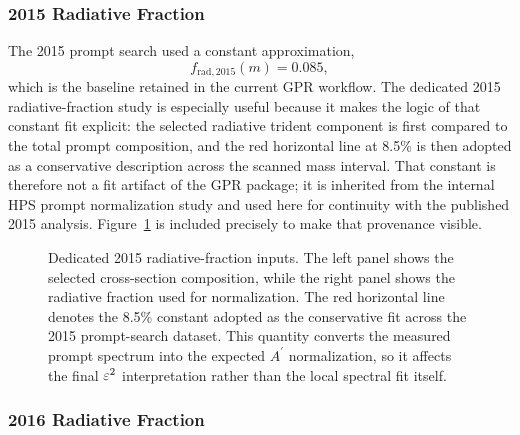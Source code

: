 \subsubsection{2015 Radiative Fraction}

The 2015 prompt search used a constant approximation,
\begin{equation}
f_{\mathrm{rad},2015}(m) = 0.085,
\end{equation}
which is the baseline retained in the current GPR workflow. The dedicated 2015
radiative-fraction study is especially useful because it makes the logic of that
constant fit explicit: the selected radiative trident component is first compared to
the total prompt composition, and the red horizontal line at 8.5\% is then adopted as
a conservative description across the scanned mass interval. That constant is therefore
not a fit artifact of the GPR package; it is inherited from the internal HPS prompt
normalization study and used here for continuity with the published 2015 analysis.
Figure~\ref{fig:2015-radfrac} is included precisely to make that provenance visible.

\begin{figure}[H]
\centering
{}
\caption{Dedicated 2015 radiative-fraction inputs. The left panel shows the selected
cross-section composition, while the right panel shows the radiative fraction used for
normalization. The red horizontal line denotes the 8.5\% constant adopted as the
conservative fit across the 2015 prompt-search dataset. This quantity converts the
measured prompt spectrum into the expected $A^\prime$ normalization, so it affects the
final $\varepsilon^2$ interpretation rather than the local spectral fit itself.}
\label{fig:2015-radfrac}
\end{figure}

\subsubsection{2016 Radiative Fraction}

